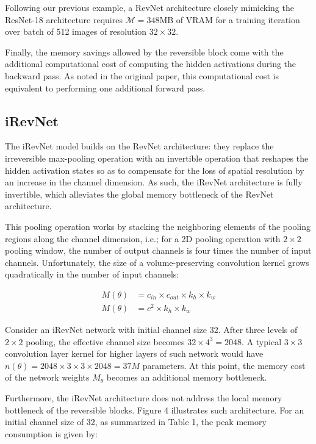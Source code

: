 \documentclass[twocolumn]{bmcart}
\begin{document}
Following our previous example, a RevNet architecture closely mimicking the ResNet-18 architecture
requires $\mathcal{M}=348$MB of VRAM for a training iteration over batch of 512 images of resolution $32 \times 32$.

Finally, the memory savings allowed by the reversible block come with the additional computational cost of computing the hidden activations during the backward pass.
As noted in the original paper, this computational cost is equivalent to performing one additional forward pass.

\subsection{iRevNet}

The iRevNet model builds on the RevNet architecture: they replace the irreversible max-pooling operation with an invertible operation that reshapes the hidden activation states
so as to compensate for the loss of spatial resolution by an increase in the channel dimension. 
As such, the iRevNet architecture is fully invertible, which alleviates the global memory bottleneck of the RevNet architecture.

This pooling operation works by stacking the neighboring elements of the pooling regions along the channel dimension,
i.e.; for a 2D pooling operation with $2 \times 2$ pooling window, the number of output channels is four times the number of input channels. 
Unfortunately, the size of a volume-preserving convolution kernel grows quadratically in the number of input channels:

\begin{subequations}
\begin{align}
M(\theta) &= c_{in} \times c_{out} \times k_h \times k_w \\
M(\theta) &= c^2 \times k_h \times k_w
\end{align}
\end{subequations}

Consider an iRevNet network with initial channel size 32.
After three levels of $2 \times 2$ pooling, the effective channel size becomes $32 \times 4^3=2048$. A typical $3 \times 3$ convolution layer kernel for higher layers of such network would have $n(\theta)=2048 \times 3 \times 3 \times 2048=37M$ parameters.
At this point, the memory cost of the network weights $M_{\theta}$ becomes an additional memory bottleneck.

Furthermore, the iRevNet architecture does not address the local memory bottleneck of the reversible blocks.
Figure 4 illustrates such architecture. 
For an initial channel size of 32, as summarized in Table 1, the peak memory consumption is given by:
\end{document}
